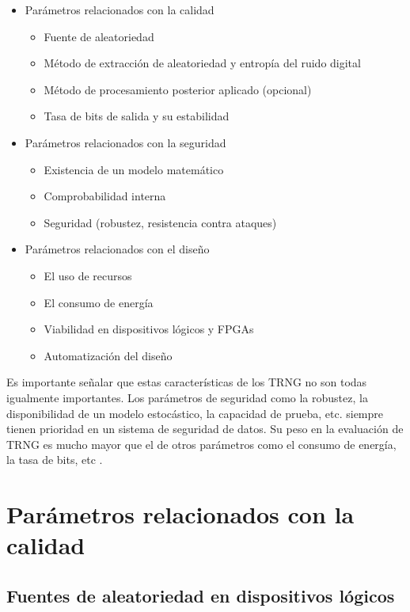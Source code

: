 	\begin{itemize}[noitemsep]
		\item Parámetros relacionados con la calidad
			\begin{itemize}[noitemsep]
				\item Fuente de aleatoriedad
				\item Método de extracción de aleatoriedad y entropía del ruido digital
				\item Método de procesamiento posterior aplicado (opcional)
				\item Tasa de bits de salida y su estabilidad
			\end{itemize}
		\item Parámetros relacionados con la seguridad
			\begin{itemize}[noitemsep]
				\item Existencia de un modelo matemático
				\item Comprobabilidad interna
				\item Seguridad (robustez, resistencia contra ataques)
			\end{itemize}
		\item Parámetros relacionados con el diseño
			\begin{itemize}[noitemsep]
				\item El uso de recursos
				\item El consumo de energía
				\item Viabilidad en dispositivos lógicos y FPGAs
				\item Automatización del diseño
			\end{itemize}
	\end{itemize}
			
	Es importante señalar que estas características de los TRNG no son todas igualmente importantes. Los parámetros de seguridad como la robustez, la disponibilidad de un modelo estocástico, la capacidad de prueba, etc. siempre tienen prioridad en un sistema de seguridad de datos. Su peso en la evaluación de TRNG es mucho mayor que el de otros parámetros como el consumo de energía, la tasa de bits, etc \cite{Badrignans2011}.
			
	\section{Parámetros relacionados con la calidad}	
	
		\subsection{Fuentes de aleatoriedad en dispositivos lógicos}
	
